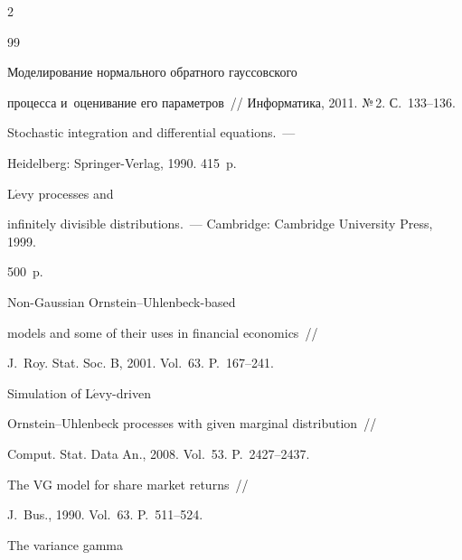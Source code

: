 \begin{multicols}{2}
{{\begin{thebibliography}{99}


     Моделирование нормального обратного гауссовского 


процесса и~оценивание его параметров~// Информатика, 2011. №\,2. С.~133--136.







     Stochastic integration and differential equations.~--- 


Heidelberg: Springer-Verlag, 1990. 415~p.


    




     L$\acute{\mbox{e}}$vy processes and 


    infinitely divisible distributions.~--- Cambridge: Cambridge University Press, 1999.


    500~p.


    




 Non-Gaussian Ornstein--Uhlenbeck-based 


models and some of their uses in financial economics~// 


J.~Roy. Stat. Soc. B, 2001. Vol.~63. P.~167--241.


    




 Simulation of L$\acute{\mbox{e}}$vy-driven 


Ornstein--Uhlenbeck processes with given marginal distribution~// 


Comput. Stat. Data An., 2008. Vol.~53.  P.~2427--2437.







     The VG model for share market returns~// 


    J.~Bus., 1990. Vol.~63. P.~511--524.







 The variance gamma 



\end{thebibliography}}}
\end{multicols}
